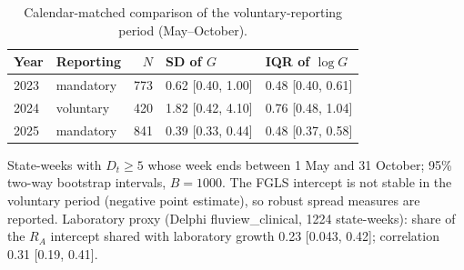 \begin{table}[htbp]
\centering
\footnotesize
\caption{Calendar-matched comparison of the voluntary-reporting period (May--October).}
\label{tab:s4}
\begin{tabular}{llrll}
\toprule
Year & Reporting & $N$ & SD of $G$ & IQR of $\log G$ \\
\midrule
2023 & mandatory & 773 & 0.62 [0.40, 1.00] & 0.48 [0.40, 0.61] \\
2024 & voluntary & 420 & 1.82 [0.42, 4.10] & 0.76 [0.48, 1.04] \\
2025 & mandatory & 841 & 0.39 [0.33, 0.44] & 0.48 [0.37, 0.58] \\
\bottomrule
\end{tabular}
\par\smallskip
\begin{minipage}{0.95\linewidth}\scriptsize State-weeks with $D_t\ge 5$ whose week ends between 1 May and 31 October; 95\% two-way bootstrap intervals, $B=1000$. The FGLS intercept is not stable in the voluntary period (negative point estimate), so robust spread measures are reported. Laboratory proxy (Delphi fluview\_clinical, 1224 state-weeks): share of the $R_A$ intercept shared with laboratory growth 0.23 [0.043, 0.42]; correlation 0.31 [0.19, 0.41].\end{minipage}
\end{table}

